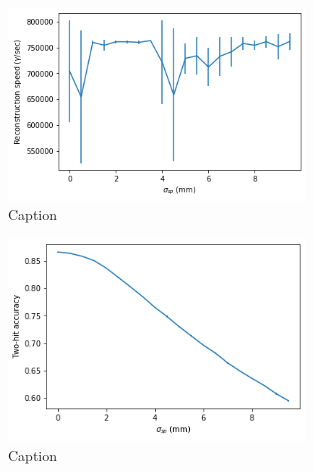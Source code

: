\begin{figure}
    \centering
    \includegraphics[width=0.7\textwidth]{graphs/pi_spNoise_speed.png}
    \caption{Caption}
    \label{fig:my_label}
\end{figure}

\begin{figure}
    \centering
    \includegraphics[width=0.7\textwidth]{graphs/pi_spNoise_acc.png}
    \caption{Caption}
    \label{fig:my_label}
\end{figure}

